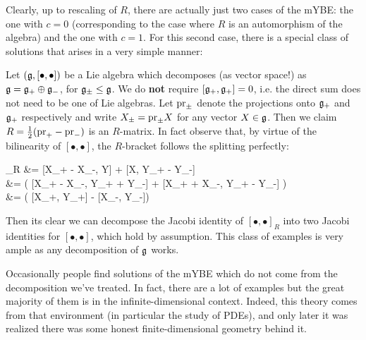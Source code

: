 \documentclass[main.tex]{subfiles}
\begin{document}
Clearly, up to rescaling of $R$, there are actually just two cases of the mYBE: the one with $c=0$ (corresponding to the case where $R$ is an automorphism of the algebra) and the one with $c=1$. For this second case, there is a special class of solutions that arises in a very simple manner:

\begin{construction}
	Let $(\mathfrak g, [\bullet,\bullet])$ be a Lie algebra which decomposes (as vector space!) as $\mathfrak g = \mathfrak g_+ \oplus \mathfrak g_-$, for $\mathfrak g_\pm \leq \mathfrak g$. We do \textbf{not} require $[\mathfrak g_+, \mathfrak g_+] = 0$, i.e. the direct sum does not need to be one of Lie algebras. Let $\mathrm{pr}_\pm$ denote the projections onto $\mathfrak g_+$ and $\mathfrak g_+$ respectively and write $X_\pm = \mathrm{pr}_\pm X$ for any vector $X \in \mathfrak g$. Then we claim $R = \frac12 (\mathrm{pr}_+ - \mathrm{pr}_-)$ is an $R$-matrix. In fact observe that, by virtue of the bilinearity of $[\bullet,\bullet]$, the $R$-bracket follows the splitting perfectly:
	\begin{eqalign}
		[X,Y]_R &=  [X_+ - X_-, Y] +  [X, Y_+ - Y_-]\\
			&=  \left( [X_+ - X_-, Y_+ + Y_-] + [X_+ + X_-, Y_+ - Y_-] \right)\\
			&=  \left( [X_+, Y_+] - [X_-, Y_-]\right)
	\end{eqalign}
	Then its clear we can decompose the Jacobi identity of $[\bullet,\bullet]_R$ into two Jacobi identities for $[\bullet,\bullet]$, which hold by assumption. This class of examples is very ample as any decomposition of $\mathfrak g$ works.
\end{construction}

Occasionally people find solutions of the mYBE which do not come from the decomposition we've treated. In fact, there are a lot of examples but the great majority of them is in the infinite-dimensional context. Indeed, this theory comes from that environment (in particular the study of PDEs), and only later it was realized there was some honest finite-dimensional geometry behind it.
\end{document}
